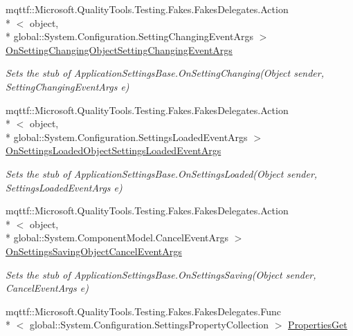 \begin{DoxyCompactItemize}
mqttf\-::\-Microsoft.\-Quality\-Tools.\-Testing.\-Fakes.\-Fakes\-Delegates.\-Action\\*
$<$ object, \\*
global\-::\-System.\-Configuration.\-Setting\-Changing\-Event\-Args $>$ \hyperlink{class_system_1_1_configuration_1_1_fakes_1_1_stub_application_settings_base_aa750230a6e27eb1f83c296afcaa067a6}{On\-Setting\-Changing\-Object\-Setting\-Changing\-Event\-Args}
\begin{DoxyCompactList}\small\item\em Sets the stub of Application\-Settings\-Base.\-On\-Setting\-Changing(\-Object sender, Setting\-Changing\-Event\-Args e)\end{DoxyCompactList}\item 
mqttf\-::\-Microsoft.\-Quality\-Tools.\-Testing.\-Fakes.\-Fakes\-Delegates.\-Action\\*
$<$ object, \\*
global\-::\-System.\-Configuration.\-Settings\-Loaded\-Event\-Args $>$ \hyperlink{class_system_1_1_configuration_1_1_fakes_1_1_stub_application_settings_base_ad7c9067c28e77f49c9e389a970266f30}{On\-Settings\-Loaded\-Object\-Settings\-Loaded\-Event\-Args}
\begin{DoxyCompactList}\small\item\em Sets the stub of Application\-Settings\-Base.\-On\-Settings\-Loaded(\-Object sender, Settings\-Loaded\-Event\-Args e)\end{DoxyCompactList}\item 
mqttf\-::\-Microsoft.\-Quality\-Tools.\-Testing.\-Fakes.\-Fakes\-Delegates.\-Action\\*
$<$ object, \\*
global\-::\-System.\-Component\-Model.\-Cancel\-Event\-Args $>$ \hyperlink{class_system_1_1_configuration_1_1_fakes_1_1_stub_application_settings_base_ad4bd71e6624c045af8664f4ae6c280a0}{On\-Settings\-Saving\-Object\-Cancel\-Event\-Args}
\begin{DoxyCompactList}\small\item\em Sets the stub of Application\-Settings\-Base.\-On\-Settings\-Saving(\-Object sender, Cancel\-Event\-Args e)\end{DoxyCompactList}\item 
mqttf\-::\-Microsoft.\-Quality\-Tools.\-Testing.\-Fakes.\-Fakes\-Delegates.\-Func\\*
$<$ global\-::\-System.\-Configuration.\-Settings\-Property\-Collection $>$ \hyperlink{class_system_1_1_configuration_1_1_fakes_1_1_stub_application_settings_base_ae3ca7d2960b744526bc0917bcc247a6a}{Properties\-Get}

\end{DoxyCompactItemize}
